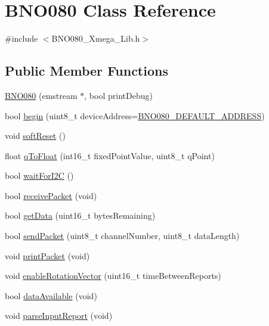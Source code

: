 \hypertarget{classBNO080}{}\section{B\+N\+O080 Class Reference}
\label{classBNO080}


{\ttfamily \#include $<$B\+N\+O080\+\_\+\+Xmega\+\_\+\+Lib.\+h$>$}

\subsection*{Public Member Functions}
\begin{DoxyCompactItemize}
\item 
\mbox{\hyperlink{classBNO080_a587f2ceae4b35e407cb76141f371e297}{B\+N\+O080}} (emstream $\ast$, bool print\+Debug)
\item 
bool \mbox{\hyperlink{classBNO080_a90592918c9267e9258e115325ac4b927}{begin}} (uint8\+\_\+t device\+Address=\mbox{\hyperlink{BNO080__Xmega__Lib_8h_a68a3909c1deb2c0e80c8db9a8e1d0e6c}{B\+N\+O080\+\_\+\+D\+E\+F\+A\+U\+L\+T\+\_\+\+A\+D\+D\+R\+E\+SS}})
\item 
void \mbox{\hyperlink{classBNO080_a9a809f442316379dbef61e78d70f6b3a}{soft\+Reset}} ()
\item 
float \mbox{\hyperlink{classBNO080_a387ca93b51c1683425b051a35850053f}{q\+To\+Float}} (int16\+\_\+t fixed\+Point\+Value, uint8\+\_\+t q\+Point)
\item 
bool \mbox{\hyperlink{classBNO080_aef8677f90f76fb28ccda5c2b32b58a16}{wait\+For\+I2C}} ()
\item 
bool \mbox{\hyperlink{classBNO080_a88d8395534116c51613dda64f105f2fe}{receive\+Packet}} (void)
\item 
bool \mbox{\hyperlink{classBNO080_ac50fa6ed3ae8b5561ee42e9830c83a7c}{get\+Data}} (uint16\+\_\+t bytes\+Remaining)
\item 
bool \mbox{\hyperlink{classBNO080_a5923c7c051c3f311aea0535dc17a42e9}{send\+Packet}} (uint8\+\_\+t channel\+Number, uint8\+\_\+t data\+Length)
\item 
void \mbox{\hyperlink{classBNO080_a5d0a36bd71601dd845090be70640c206}{print\+Packet}} (void)
\item 
void \mbox{\hyperlink{classBNO080_a6e909dff75a75500117287304004aac6}{enable\+Rotation\+Vector}} (uint16\+\_\+t time\+Between\+Reports)
\item 
bool \mbox{\hyperlink{classBNO080_a27933a4623309a040eb0d456723ff57b}{data\+Available}} (void)
\item 
void \mbox{\hyperlink{classBNO080_a960b884f27623823999a69b2c3fa9925}{parse\+Input\+Report}} (void)

\end{DoxyCompactItemize}
